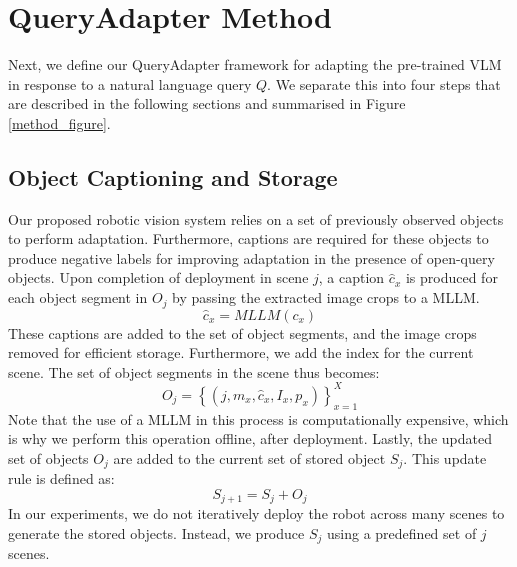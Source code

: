 
\section{QueryAdapter Method}
\label{sec:adaptation}
Next, we define our QueryAdapter framework for adapting the pre-trained VLM in response to a natural language query $Q$. We separate this into four steps that are described in the following sections and summarised in Figure \ref{method_figure}.

\subsection{Object Captioning and Storage}
Our proposed robotic vision system relies on a set of previously observed objects to perform adaptation. Furthermore, captions are required for these objects to produce negative labels for improving adaptation in the presence of open-query objects. Upon completion of deployment in scene $j$, a caption $\hat{c}_{x}$ is produced for each object segment in $O_{j}$ by passing the extracted image crops to a MLLM.
\begin{equation}
    \hat{c}_{x} = MLLM\left( c_{x}\right)
\end{equation}
These captions are added to the set of object segments, and the image crops removed for efficient storage. Furthermore, we add the index for the current scene. The set of object segments in the scene thus becomes:
\begin{equation}
    O_{j} = \left\{\left(j, m_{x}, \hat{c}_{x}, I_{x}, p_{x} \right)\right\}^{X}_{x=1}
\end{equation}
Note that the use of a MLLM in this process is computationally expensive, which is why we perform this operation offline, after deployment. Lastly, the updated set of objects $O_{j}$ are added to the current set of stored object $S_{j}$. This update rule is defined as:
\begin{equation}
    S_{j+1} = S_{j}+O_{j}
\end{equation}
In our experiments, we do not iteratively deploy the robot across many scenes to generate the stored objects. Instead, we produce $S_{j}$ using a predefined set of $j$ scenes.

